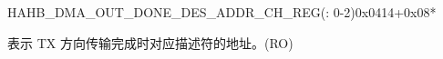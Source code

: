 \begin{register}{H}{AHB\_DMA\_OUT\_DONE\_DES\_ADDR\_CH\_REG(: 0-2)}{0x0414+0x08*}\label{regdesc:AHBDMAOUTDONEDESADDRCHNREG}
%
\regnewline%
\begin{regdesc}\begin{reglist}
\label{fielddesc:AHBDMAOUTDONEDESADDRCHNREG}\item [AHB\_DMA\_OUT\_DONE\_DES\_ADDR\_CH\regindex{n}] 表示 TX 方向传输完成时对应描述符的地址。(RO)
\end{reglist}\end{regdesc}
\end{register}
